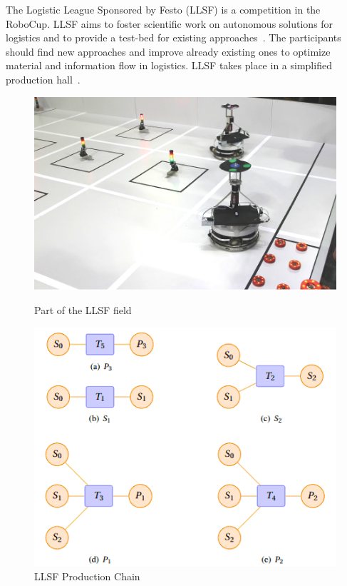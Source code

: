 \label{sec:llsf}
The Logistic League Sponsored by Festo (LLSF) is a competition in the RoboCup. LLSF aims to foster scientific work on autonomous solutions for logistics and to provide a test-bed for existing approaches~\cite{LLSFTestbed}. The participants should find new approaches and improve already existing ones to optimize material and information flow in logistics.
LLSF takes place  in a simplified production hall~\cite{LLSFRules}.
\begin{figure}
\begin{minipage}[b]{0.5\linewidth}
\includegraphics[scale=0.23]{pics/llsf}
\caption{Part of the LLSF field}
\label{fig:llsf_field}
\end{minipage}
\quad
\begin{minipage}[b]{0.5\linewidth}
\includegraphics[scale=0.45]{pics/production_chain}
\caption{LLSF Production Chain~\cite{LLSFRules}}
\label{fig:llsf_chain}
\end{minipage}
\end{figure}
